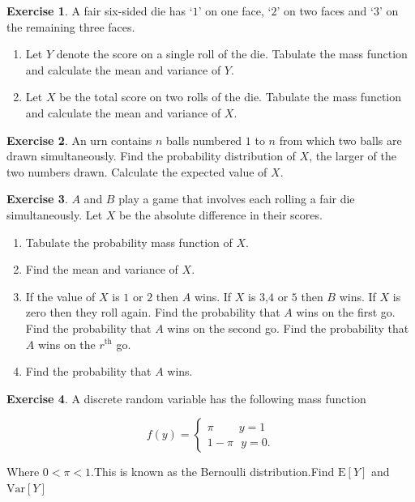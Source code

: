 \documentclass[
]{book}
\theoremstyle{definition}
\theoremstyle{definition}
\theoremstyle{definition}
\newtheorem{exercise}{Exercise}[chapter]
\theoremstyle{definition}
\theoremstyle{remark}
\begin{document}
\begin{exercise}

A fair six-sided die has `\(1\)' on one face, `\(2\)' on two faces and `\(3\)' on the remaining three faces.

\begin{enumerate}
\def\labelenumi{\alph{enumi})}
\item
  Let \(Y\) denote the score on a single roll of the die. Tabulate the mass function and calculate the mean and variance of \(Y\).
\item
  Let \(X\) be the total score on two rolls of the die. Tabulate the mass function and calculate the mean and variance of \(X\).
\end{enumerate}

\end{exercise}

\begin{exercise}
An urn contains \(n\) balls numbered \(1\) to \(n\) from which two balls are drawn simultaneously. Find the probability distribution of \(X\), the larger of the two numbers drawn. Calculate the expected value of \(X\).
\end{exercise}

\begin{exercise}

\(A\) and \(B\) play a game that involves each rolling a fair die simultaneously. Let \(X\) be the absolute difference in their scores.

\begin{enumerate}
\def\labelenumi{\alph{enumi})}
\item
  Tabulate the probability mass function of \(X\).
\item
  Find the mean and variance of \(X\).
\item
  If the value of \(X\) is \(1\) or \(2\) then \(A\) wins. If \(X\) is \(3\),\(4\) or \(5\) then \(B\) wins. If \(X\) is zero then they roll again. Find the probability that \(A\) wins on the first go. Find the probability that \(A\) wins on the second go. Find the probability that \(A\) wins on the \(r^{\text{th}}\) go.
\item
  Find the probability that \(A\) wins.
\end{enumerate}

\end{exercise}

\begin{exercise}
A discrete random variable has the following mass function

\begin{equation*}
  f(y)=\begin{cases}
    \pi \ \ \ \ \ \ \ \ \ \  y = 1 \\
    1-\pi \ \  \ y = 0 .
  \end{cases}
\end{equation*}

Where \(0<\pi<1\).This is known as the Bernoulli distribution.Find \(\text{E}[Y]\) and \(\text{Var}[Y]\)
\end{exercise}
\end{document}
